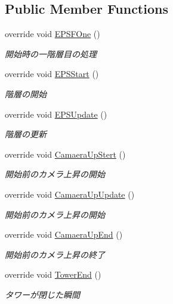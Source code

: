 \subsection*{Public Member Functions}
\begin{DoxyCompactItemize}
\item 
override void \hyperlink{class_object_arrangement_system_ade64515d0fbc603769836f567070264c}{E\+P\+S\+F\+One} ()
\begin{DoxyCompactList}\small\item\em 開始時の一階層目の処理 \end{DoxyCompactList}\item 
override void \hyperlink{class_object_arrangement_system_a52e57370ef553b04a50cf8ee6ae81f64}{E\+P\+S\+Start} ()
\begin{DoxyCompactList}\small\item\em 階層の開始 \end{DoxyCompactList}\item 
override void \hyperlink{class_object_arrangement_system_ad41ad5ccd9012b9992e9ae7c65768082}{E\+P\+S\+Update} ()
\begin{DoxyCompactList}\small\item\em 階層の更新 \end{DoxyCompactList}\item 
override void \hyperlink{class_object_arrangement_system_a98764c494fecf8dce4726107d4539374}{Camaera\+Up\+Stert} ()
\begin{DoxyCompactList}\small\item\em 開始前のカメラ上昇の開始 \end{DoxyCompactList}\item 
override void \hyperlink{class_object_arrangement_system_a7fba170e4af44f3ea4083edebe7e74fc}{Camaera\+Up\+Update} ()
\begin{DoxyCompactList}\small\item\em 開始前のカメラ上昇の開始 \end{DoxyCompactList}\item 
override void \hyperlink{class_object_arrangement_system_ab4a0e5a7a8e5488cbae90f485bb86e5f}{Camaera\+Up\+End} ()
\begin{DoxyCompactList}\small\item\em 開始前のカメラ上昇の終了 \end{DoxyCompactList}\item 
override void \hyperlink{class_object_arrangement_system_a3f1c0ac72189d1a065596b408b04348e}{Tower\+End} ()
\begin{DoxyCompactList}\small\item\em タワーが閉じた瞬間 \end{DoxyCompactList}\end{DoxyCompactItemize}
